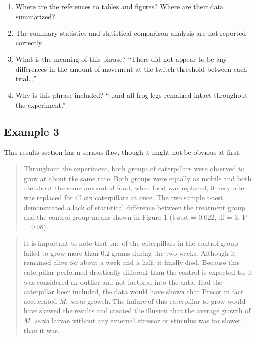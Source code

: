 \documentclass[
]{book}
\providecommand{\tightlist}{%
  \setlength{\itemsep}{0pt}\setlength{\parskip}{0pt}}
\begin{document}
\begin{enumerate}
\def\labelenumi{\arabic{enumi}.}
\tightlist
\item
  Where are the references to tables and figures? Where are their data summarized?
\item
  The summary statistics and statistical comparison analysis are not reported correctly.
\item
  What is the meaning of this phrase? ``There did not appear to be any differences in the amount of movement at the twitch threshold between each trial\ldots{}''
\item
  Why is this phrase included? ``\ldots and all frog legs remained intact throughout the experiment.''
\end{enumerate}

\hypertarget{example-3-5}{%
\subsection{Example 3}\label{example-3-5}}

This results section has a serious flaw, though it might not be obvious at first.

\begin{quote}
Throughout the experiment, both groups of caterpillars were observed to grow at about the same rate. Both groups were equally as mobile and both ate about the same amount of food; when food was replaced, it very often was replaced for all six caterpillars at once. The two sample t-test demonstrated a lack of statistical difference between the treatment group and the control group means shown in Figure 1 (t-stat = 0.022, df = 3, P = 0.98).
\end{quote}

\begin{quote}
It is important to note that one of the caterpillars in the control group failed to grow more than 0.2 grams during the two weeks. Although it remained alive for about a week and a half, it finally died. Because this caterpillar performed drastically different than the control is expected to, it was considered an outlier and not factored into the data. Had the caterpillar been included, the data would have shown that Precor in fact accelerated \emph{M. sexta} growth. The failure of this caterpillar to grow would have skewed the results and created the illusion that the average growth of \emph{M. sexta} larvae without any external stressor or stimulus was far slower than it was.
\end{quote}
\end{document}
